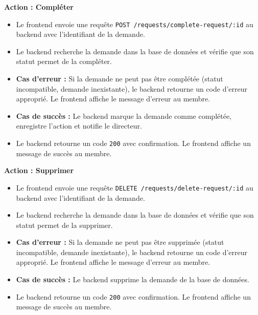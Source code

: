 \begin{enumerate}
  \textbf{Action : Compléter}
  \begin{itemize}
      \item Le frontend envoie une requête \texttt{POST /requests/complete-request/:id} au backend avec l'identifiant de la demande.
      \item Le backend recherche la demande dans la base de données et vérifie que son statut permet de la compléter.
      \item \textbf{Cas d'erreur :} Si la demande ne peut pas être complétée (statut incompatible, demande inexistante), le backend retourne un code d'erreur approprié. Le frontend affiche le message d'erreur au membre.
      \item \textbf{Cas de succès :} Le backend marque la demande comme complétée, enregistre l'action et notifie le directeur.
      \item Le backend retourne un code \texttt{200} avec confirmation. Le frontend affiche un message de succès au membre.
  \end{itemize}
  
  \textbf{Action : Supprimer}
  \begin{itemize}
      \item Le frontend envoie une requête \texttt{DELETE /requests/delete-request/:id} au backend avec l'identifiant de la demande.
      \item Le backend recherche la demande dans la base de données et vérifie que son statut permet de la supprimer.
      \item \textbf{Cas d'erreur :} Si la demande ne peut pas être supprimée (statut incompatible, demande inexistante), le backend retourne un code d'erreur approprié. Le frontend affiche le message d'erreur au membre.
      \item \textbf{Cas de succès :} Le backend supprime la demande de la base de données.
      \item Le backend retourne un code \texttt{200} avec confirmation. Le frontend affiche un message de succès au membre.
  \end{itemize}
\end{enumerate}
